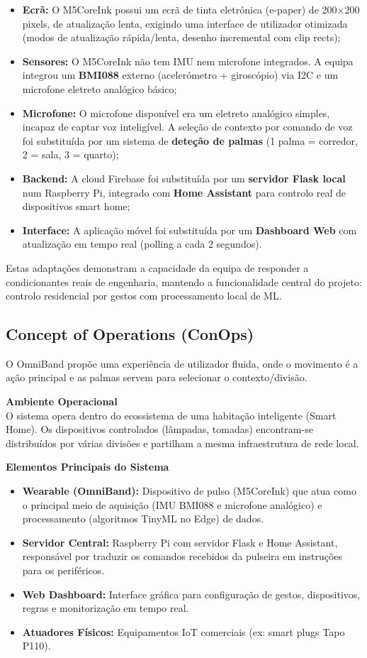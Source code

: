 \documentclass[11pt, a4paper]{article}
\begin{document}
\begin{itemize}
    \item \textbf{Ecrã:} O M5CoreInk possui um ecrã de tinta eletrónica (e-paper) de 200$\times$200 pixels, de atualização lenta, exigindo uma interface de utilizador otimizada (modos de atualização rápida/lenta, desenho incremental com clip rects);
    \item \textbf{Sensores:} O M5CoreInk não tem IMU nem microfone integrados. A equipa integrou um \textbf{BMI088} externo (acelerómetro + giroscópio) via I2C e um microfone eletreto analógico básico;
    \item \textbf{Microfone:} O microfone disponível era um eletreto analógico simples, incapaz de captar voz inteligível. A seleção de contexto por comando de voz foi substituída por um sistema de \textbf{deteção de palmas} (1 palma = corredor, 2 = sala, 3 = quarto);
    \item \textbf{Backend:} A cloud Firebase foi substituída por um \textbf{servidor Flask local} num Raspberry Pi, integrado com \textbf{Home Assistant} para controlo real de dispositivos smart home;
    \item \textbf{Interface:} A aplicação móvel foi substituída por um \textbf{Dashboard Web} com atualização em tempo real (polling a cada 2 segundos).
\end{itemize}

Estas adaptações demonstram a capacidade da equipa de responder a condicionantes reais de engenharia, mantendo a funcionalidade central do projeto: controlo residencial por gestos com processamento local de ML.

\subsection{Concept of Operations (ConOps)}
O OmniBand propõe uma experiência de utilizador fluida, onde o movimento é a ação principal e as palmas servem para selecionar o contexto/divisão.

\textbf{Ambiente Operacional}\\
O sistema opera dentro do ecossistema de uma habitação inteligente (Smart Home). Os dispositivos controlados (lâmpadas, tomadas) encontram-se distribuídos por várias divisões e partilham a mesma infraestrutura de rede local.

\textbf{Elementos Principais do Sistema}
\begin{itemize}
    \item \textbf{Wearable (OmniBand):} Dispositivo de pulso (M5CoreInk) que atua como o principal meio de aquisição (IMU BMI088 e microfone analógico) e processamento (algoritmos TinyML no Edge) de dados.
    \item \textbf{Servidor Central:} Raspberry Pi com servidor Flask e Home Assistant, responsável por traduzir os comandos recebidos da pulseira em instruções para os periféricos.
    \item \textbf{Web Dashboard:} Interface gráfica para configuração de gestos, dispositivos, regras e monitorização em tempo real.
    \item \textbf{Atuadores Físicos:} Equipamentos IoT comerciais (ex: smart plugs Tapo P110).
\end{itemize}
\end{document}
